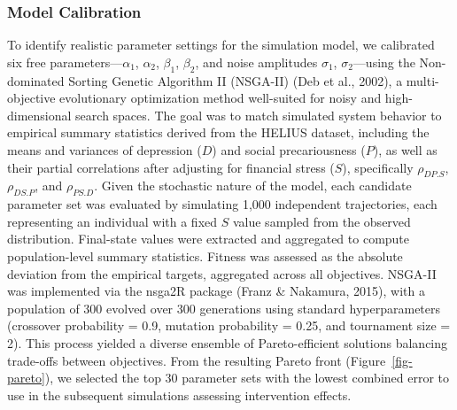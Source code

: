 \documentclass[
]{article}
\begin{document}
\subsubsection{Model Calibration}\label{model-calibration}

To identify realistic parameter settings for the simulation model, we
calibrated six free parameters---\(\alpha_1\), \(\alpha_2\),
\(\beta_1\), \(\beta_2\), and noise amplitudes \(\sigma_1\),
\(\sigma_2\)---using the Non-dominated Sorting Genetic Algorithm II
(NSGA-II) (Deb et al., 2002), a multi-objective evolutionary
optimization method well-suited for noisy and high-dimensional search
spaces. The goal was to match simulated system behavior to empirical
summary statistics derived from the HELIUS dataset, including the means
and variances of depression (\(D\)) and social precariousness (\(P\)),
as well as their partial correlations after adjusting for financial
stress (\(S\)), specifically \(\rho_{DP.S}\), \(\rho_{DS.P}\), and
\(\rho_{PS.D}\). Given the stochastic nature of the model, each
candidate parameter set was evaluated by simulating 1,000 independent
trajectories, each representing an individual with a fixed \(S\) value
sampled from the observed distribution. Final-state values were
extracted and aggregated to compute population-level summary statistics.
Fitness was assessed as the absolute deviation from the empirical
targets, aggregated across all objectives. NSGA-II was implemented via
the nsga2R package (Franz \& Nakamura, 2015), with a population of 300
evolved over 300 generations using standard hyperparameters (crossover
probability = 0.9, mutation probability = 0.25, and tournament size =
2). This process yielded a diverse ensemble of Pareto-efficient
solutions balancing trade-offs between objectives. From the resulting
Pareto front (Figure~\ref{fig-pareto}), we selected the top 30 parameter
sets with the lowest combined error to use in the subsequent simulations
assessing intervention effects.
\end{document}
